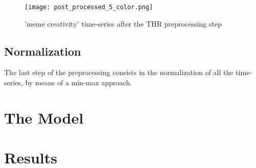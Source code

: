 \documentclass[conference]{IEEEtran}
\begin{document}
    \begin{figure}[]
        \texttt{[image: post\_processed\_5\_color.png]}
        \caption{'meme creativity' time-series after the THR preprocessing step}
        \label{fig:post_processed_5_color}
    \end{figure}
\subsection{Normalization}
The last step of the preprocessing consists in the normalization of all the time-series, by means of a min-max approach.

\section{The Model}

\section{Results}
\end{document}
